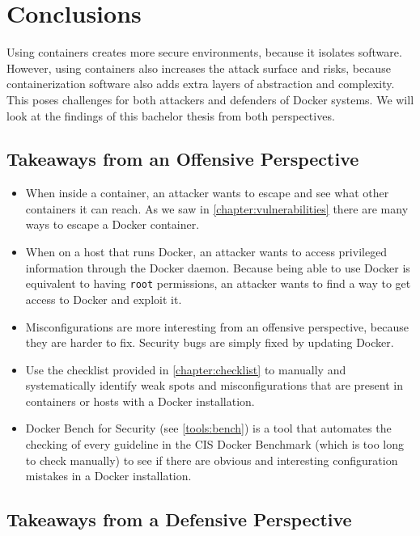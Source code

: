 \chapter{Conclusions}\label{chapter:conclusions}
Using containers creates more secure environments, because it isolates software. However, using containers also increases the attack surface and risks, because containerization software also adds extra layers of abstraction and complexity. This poses challenges for both attackers and defenders of Docker systems. We will look at the findings of this bachelor thesis from both perspectives.

\section{Takeaways from an Offensive Perspective}

\begin{itemize}
    \item When inside a container, an attacker wants to escape and see what other containers it can reach. As we saw in \autoref{chapter:vulnerabilities} there are many ways to escape a Docker container.

    \item When on a host that runs Docker, an attacker wants to access privileged information through the Docker daemon. Because being able to use Docker is equivalent to having \lstinline{root} permissions, an attacker wants to find a way to get access to Docker and exploit it.

    \item Misconfigurations are more interesting from an offensive perspective, because they are harder to fix. Security bugs are simply fixed by updating Docker.

    \item Use the checklist provided in \autoref{chapter:checklist} to manually and systematically identify weak spots and misconfigurations that are present in containers or hosts with a Docker installation.

    \item Docker Bench for Security (see \autoref{tools:bench}) is a tool that automates the checking of every guideline in the CIS Docker Benchmark (which is too long to check manually) to see if there are obvious and interesting configuration mistakes in a Docker installation.

\end{itemize}

\section{Takeaways from a Defensive Perspective}

